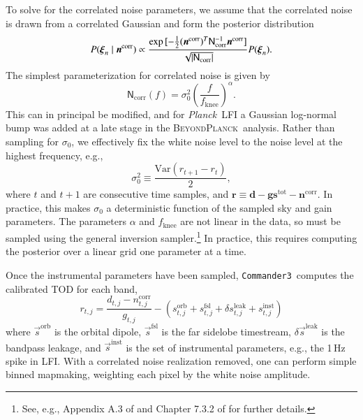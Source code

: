 \documentclass[twocolumn]{../../common/aa}
\def\Planck{\emph{Planck}}
\def\commanderthree{\texttt{Commander3}}
\newcommand{\n}[0]{\vec{n}}
\newcommand{\s}[0]{\vec{s}}
\newcommand{\N}[0]{\tens{N}}
\newcommand{\bp}{\textsc{BeyondPlanck}}
\begin{document}
To solve for the correlated noise parameters, we assume that the correlated noise is drawn from a correlated Gaussian and form the posterior distribution
\begin{equation}
	P(\boldsymbol\xi_n\mid\n^\mathrm{corr})\propto\frac{\exp{[-\frac12(\n^\mathrm{corr})^T\N_\mathrm{corr}^{-1}\n^\mathrm{corr}]}}
	{\sqrt{|\N_\mathrm{corr}|}}P(\boldsymbol\xi_n).
\end{equation}
The simplest parameterization for correlated noise is given by
\begin{equation}
	\mathsf N_\mathrm{corr}(f)=\sigma_0^2\left(\frac f{f_\mathrm{knee}}\right)^\alpha.
\end{equation}
This can in principal be modified, and for \Planck\ LFI a Gaussian log-normal bump was added at a late stage in the \bp\ analysis. Rather than sampling for $\sigma_0$, we effectively fix the white noise level to the noise level at the highest frequency, e.g.,
\begin{equation}
	\sigma_0^2\equiv\frac{\mathrm{Var}(r_{t+1}-r_t)}2,
\end{equation}
where $t$ and $t+1$ are consecutive time samples, and ${\boldsymbol r\equiv\boldsymbol d-\boldsymbol g\boldsymbol s^\mathrm{tot}
-\boldsymbol n^\mathrm{corr}}$. In practice, this makes $\sigma_0$ a deterministic function of the sampled sky and gain parameters. The parameters $\alpha$ and $f_\mathrm{knee}$ are not linear in the data, so must be sampled using the general inversion sampler.\footnote{See, e.g., Appendix A.3 of \citet{bp01} and Chapter 7.3.2 of \citet{numerical_recipes} for further details.} In practice, this requires computing the posterior over a linear grid  one parameter at a time.


Once the instrumental parameters have been sampled, \commanderthree\ computes the calibrated TOD for each band,
\begin{equation}
	r_{t,j}=\frac{d_{t,j}-n_{t,j}^\mathrm{corr}}{g_{t,j}}-\left(s_{t,j}^\mathrm{orb}
	+s_{t,j}^\mathrm{fsl}+\delta s_{t,j}^\mathrm{leak}+s_{t,j}^\mathrm{inst}\right)
\end{equation}
where $\s^\mathrm{orb}$ is the orbital dipole, $\s^\mathrm{fsl}$ is the far sidelobe timestream, $\delta\s^\mathrm{leak}$ is the bandpass leakage, and $\s^\mathrm{inst}$ is the set of instrumental parameters, e.g., the 1\,Hz spike in LFI. With a correlated noise realization removed, one can perform simple binned mapmaking, weighting each pixel by the white noise amplitude.

\end{document}
